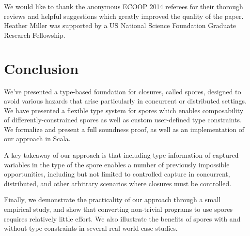 \documentclass[runningheads]{llncs}
\begin{document}
\begin{sloppypar}
We would like to thank the anonymous ECOOP 2014 referees for their thorough
reviews and helpful suggestions which greatly improved the quality of the
paper. Heather Miller was supported by a US National Science Foundation
Graduate Research Fellowship.

\section{Conclusion}
\label{sec:conclusion}

We've presented a type-based foundation for closures, called spores, designed
to avoid various hazards that arise particularly in concurrent or distributed
settings. We have presented a flexible type system for spores which enables
composability of differently-constrained spores as well as custom user-defined
type constraints. We formalize and present a full soundness proof, as well as
an implementation of our approach in Scala.

A key takeaway of our approach is that including type information of captured
variables in the type of the spore enables a number of previously impossible
opportunities, including but not limited to controlled capture in concurrent,
distributed, and other arbitrary scenarios where closures must be
controlled.

Finally, we demonstrate the practicality of our approach through a small
empirical study, and show that converting non-trivial
programs to use spores requires relatively little effort. We also illustrate
the benefits of spores with and without type constraints in several real-world
case studies.








\end{sloppypar}
\end{document}

